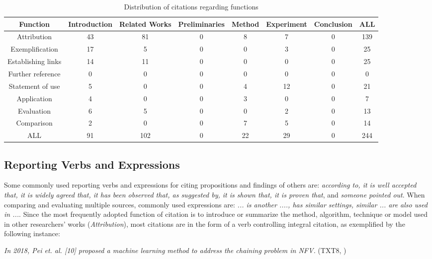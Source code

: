 \begin{table}[thb]
    \caption{Distribution of citations regarding functions}
    \centering
      \begin{tabulary}{\linewidth}{CCCCCCCC}
        \toprule[1.5pt]
        \textbf{Function} & \textbf{Introduction} & \textbf{Related Works} & \textbf{Preliminaries} & \textbf{Method} & \textbf{Experiment} & \textbf{Conclusion} & \textbf{ALL} \\
        \midrule[1pt]
        Attribution & 43 & 81 & 0 & 8 & 7 & 0 & 139\\
        Exemplification & 17 & 5 & 0 & 0 & 3 & 0 & 25\\
        Establishing links & 14 & 11 & 0 & 0 & 0 & 0 & 25\\
        Further reference & 0 & 0 & 0 & 0 & 0 & 0 & 0\\
        Statement of use & 5 & 0 & 0 & 4 & 12 & 0 & 21\\
        Application & 4 & 0 & 0 & 3 & 0 & 0 & 7\\
        Evaluation & 6 & 5 & 0 & 0 & 2 & 0 & 13\\
        Comparison & 2 & 0 & 0 & 7 & 5 & 0 & 14\\
        ALL & 91 & 102 & 0 & 22 & 29 & 0 & 244 \\
      \bottomrule[1.5pt]
    \end{tabulary}
    \label{tab:citation_function}
\end{table}

\subsection{Reporting Verbs and Expressions}
\label{subsec:verbs}
Some commonly used reporting verbs and expressions for citing propositions and findings of others are: \textit{according to, it is well accepted that, it is widely agreed that, it has been observed that, as suggested by, it is shown that, it is proven that}, and \textit{someone pointed out}. When comparing and evaluating multiple sources, commonly used expressions are: \textit{... is another ...., has similar settings, similar ... are also used in ...}. Since the most frequently adopted function of citation is to introduce or summarize the method, algorithm, technique or model used in other researchers’ works (\textit{Attribution}), most citations are in the form of a verb controlling integral citation, as exemplified by the following instance:

\textit{In 2018, Pei et. al. [10] proposed a machine learning method to address the chaining problem in NFV.} (TXT8, \citealp{yi_comprehensive_2018})

